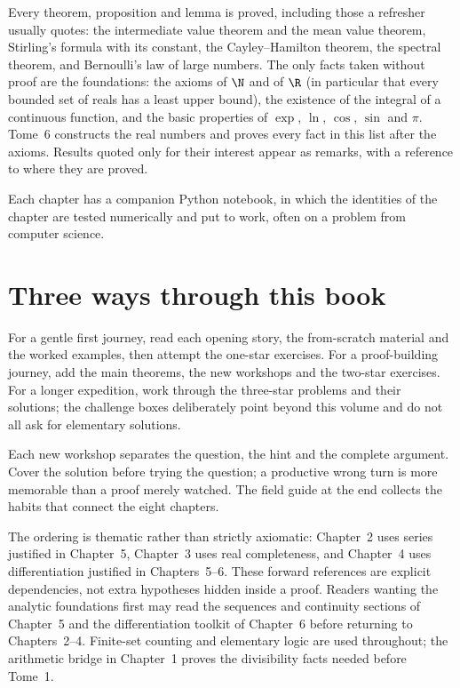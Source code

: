 Every theorem, proposition and lemma is proved, including those a refresher usually quotes: the intermediate value
theorem and the mean value theorem, Stirling's formula with its constant, the Cayley--Hamilton theorem, the spectral
theorem, and Bernoulli's law of large numbers. The only facts taken without proof are the foundations: the axioms of
$\N$ and of $\R$ (in particular that every bounded set of reals has a least upper bound), the existence of the integral
of a continuous function, and the basic properties of $\exp$, $\ln$, $\cos$, $\sin$ and $\pi$. Tome~6 constructs the
real numbers and proves every fact in this list after the axioms. Results quoted only for their interest appear as
remarks, with a reference to where they are proved.

Each chapter has a companion Python notebook, in which the identities of the chapter are tested numerically and
put to work, often on a problem from computer science.

\section*{Three ways through this book}
For a gentle first journey, read each opening story, the from-scratch material and the worked examples, then attempt the one-star exercises. For a proof-building journey, add the main theorems, the new workshops and the two-star exercises. For a longer expedition, work through the three-star problems and their solutions; the challenge boxes deliberately point beyond this volume and do not all ask for elementary solutions.

Each new workshop separates the question, the hint and the complete argument. Cover the solution before trying the question; a productive wrong turn is more memorable than a proof merely watched. The field guide at the end collects the habits that connect the eight chapters.

The ordering is thematic rather than strictly axiomatic: Chapter~2 uses series justified in Chapter~5, Chapter~3 uses real completeness, and Chapter~4 uses differentiation justified in Chapters~5--6. These forward references are explicit dependencies, not extra hypotheses hidden inside a proof. Readers wanting the analytic foundations first may read the sequences and continuity sections of Chapter~5 and the differentiation toolkit of Chapter~6 before returning to Chapters~2--4. Finite-set counting and elementary logic are used throughout; the arithmetic bridge in Chapter~1 proves the divisibility facts needed before Tome~1.
